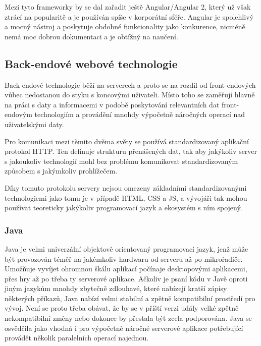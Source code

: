 		Mezi tyto frameworky by se dal zařadit ještě Angular/Angular 2, který už však ztrácí na popularitě a je používán spíše v
		korporátní sféře.
		Angular je spolehlivý a mocný nástroj a poskytuje obdobné funkcionality jako konkurence,
		nicméně nemá moc dobrou dokumentaci a je obtížný na naučení. \cite{react_vs_angular}

	\subsection{Back-endové webové technologie}

	Back-endové technologie běží na serverech a proto se na rozdíl od front-endových vůbec nedostanou do styku s koncovými uživateli.
	Místo toho se zaměřují hlavně na práci s daty a informacemi v podobě poskytování relevantních dat front-endovým
	technologiím a provádění mnohdy výpočetně náročných operací nad uživatelskými daty.

	Pro komunikaci mezi těmito dvěma světy se používá standardizovaný aplikační protokol \noindent\Ac{HTTP}.
	Ten definuje strukturu přenášených dat, tak aby jakýkoliv server s jakoukoliv technologií mohl bez problému komunikovat
	standardizovaným způsobem s jakýmkoliv prohlížečem. \cite{http}

	Díky tomuto protokolu servery nejsou omezeny základními standardizovanými technologiemi jako tomu je v případě
	\Ac{HTML}, \Ac{CSS} a \ac{JS}, a vývojáři tak mohou používat teoreticky jakýkoliv programovací jazyk a ekosystém s ním
	spojený.

		\subsubsection{Java}

		Java je velmi univerzální objektově orientovaný programovací jazyk, jenž může být provozován téměř na jakémkoliv
		hardwaru od serveru až po mikrořadiče.
		Umožňuje vyvíjet ohromnou škálu aplikací počínaje desktopovými aplikacemi, přes hry až po třeba ty
		serverové aplikace. \cite{java}
		Ačkoliv je psaní kódu v Javě oproti jiným jazykům mnohdy zbytečně zdlouhavé, které nabízejí kratší zápisy
		některých příkazů, Java nabízí velmi stabilní a zpětně kompatibilní prostředí pro vývoj.
		Není se proto třeba obávat, že by se v příští verzi udály velké zpětně nekompatibilní změny nebo dokonce
		by přestala být zcela podporována.
		Java se osvědčila jako vhodná i pro výpočetně náročné serverové aplikace potřebující provádět několik paralelních
		operací najednou.

